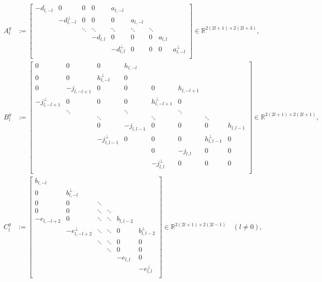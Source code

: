 \documentclass[11pt, oneside]{article}   	%
\newcommand{\R}{\mathbb{R}}
\begin{document}
\begin{align}
A^y_l &:= \begin{bmatrix}
		-d_{l,-l} & 0 & 0 & 0 & a_{l,-l} & & \\
		& -d^\perp_{l,-l} & 0 & 0 & 0 & a_{l,-l} & & \\
		& & \ddots & \ddots & \ddots & \ddots & \ddots & \\
		& & & -d_{l,l} & 0 & 0 & 0 & a_{l,l} \\
		& & & & -d^\perp_{l,l} & 0 & 0 & 0 & a^\perp_{l,-l}  \\
	    \end{bmatrix} \in \R^{2(2l+1)\times2(2l+3)},
\end{align}
\begin{align}
B^y_l &:= \begin{bmatrix}
		0 & 0 & 0 & h_{l,-l} & & \\
		0 & 0 & h^\perp_{l,-l} & 0 & & \\
		0 & -j_{l,-l+1} & 0 & 0 & 0 & h_{l,-l+1} \\
		-j^\perp_{l,-l+1} & 0 & 0 & 0 & h^\perp_{l,-l+1} & 0 \\
		& \ddots & & \ddots & & \ddots \\
		& & \ddots & & \ddots & & \ddots \\
		& & 0 & -j_{l,l-1} & 0 & 0 & 0 & h_{l,l-1} \\
		& & -j^\perp_{l,l-1} & 0 & 0 & 0 & h^\perp_{l,l-1} & 0 \\
		& & & & 0 & -j_{l,l} & 0 & 0 \\
		& & & & -j^\perp_{l,l} & 0 & 0 & 0 \\
		\end{bmatrix}  \in \R^{2(2l+1)\times2(2l+1)}, 
\end{align}
\begin{align}
C^y_l &:= \begin{bmatrix}
		b_{l,-l} & & \\
		0 & b^\perp_{l,-l} \\
		0 & 0 & \ddots & \\
		0 & 0 & \ddots & \ddots \\
		-e_{l,-l+2} & 0 & \ddots & \ddots & b_{l,l-2} \\
		& -e^\perp_{l,-l+2} & \ddots & \ddots & 0 & b^\perp_{l,l-2} \\
		& & \ddots & \ddots & 0 & 0 \\
		& & & \ddots & 0 & 0 \\
		& & & & -e_{l,l} & 0 \\
		& & & & & -e^\perp_{l,l} \\
	    \end{bmatrix} \in \R^{2(2l+1)\times2(2l-1)} \quad (l \ne 0),
\end{align}
\end{document}
